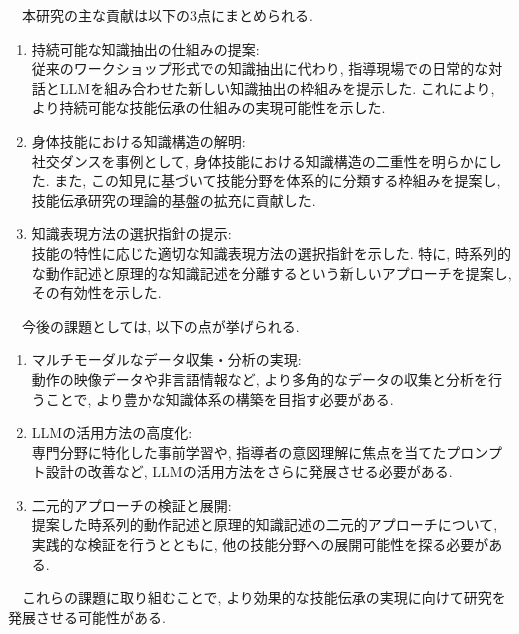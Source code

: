 　本研究の主な貢献は以下の3点にまとめられる.\\
\begin{enumerate}
    \item 持続可能な知識抽出の仕組みの提案:\\
    従来のワークショップ形式での知識抽出に代わり, 指導現場での日常的な対話とLLMを組み合わせた新しい知識抽出の枠組みを提示した. これにより, より持続可能な技能伝承の仕組みの実現可能性を示した.

    \item 身体技能における知識構造の解明:\\
    社交ダンスを事例として, 身体技能における知識構造の二重性を明らかにした. また, この知見に基づいて技能分野を体系的に分類する枠組みを提案し, 技能伝承研究の理論的基盤の拡充に貢献した.

    \item 知識表現方法の選択指針の提示:\\
    技能の特性に応じた適切な知識表現方法の選択指針を示した. 特に, 時系列的な動作記述と原理的な知識記述を分離するという新しいアプローチを提案し, その有効性を示した.
\end{enumerate}
　今後の課題としては, 以下の点が挙げられる.\\
\begin{enumerate}
    \item マルチモーダルなデータ収集・分析の実現:\\
    動作の映像データや非言語情報など, より多角的なデータの収集と分析を行うことで, より豊かな知識体系の構築を目指す必要がある.

    \item LLMの活用方法の高度化:\\
    専門分野に特化した事前学習や, 指導者の意図理解に焦点を当てたプロンプト設計の改善など, LLMの活用方法をさらに発展させる必要がある.

    \item 二元的アプローチの検証と展開:\\
    提案した時系列的動作記述と原理的知識記述の二元的アプローチについて, 実践的な検証を行うとともに, 他の技能分野への展開可能性を探る必要がある.
\end{enumerate}
　これらの課題に取り組むことで, より効果的な技能伝承の実現に向けて研究を発展させる可能性がある.\\

